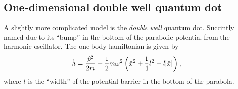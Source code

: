     \subsection{One-dimensional double well quantum dot}
        A slightly more complicated model is the \emph{double well} quantum dot.
        Succintly named due to its ``bump'' in the bottom of the parabolic
        potential from the harmonic oscillator. The one-body hamiltonian is
        given by
        \begin{align}
            \hat{h} = \frac{\hat{p}^2}{2m}
            + \frac{1}{2} m\omega^2\left( 
                \hat{x}^2
                + \frac{1}{4}l^2
                - l\abs{\hat{x}}
             \right),
        \end{align}
        where $l$ is the ``width'' of the potential barrier in the bottom of the
        parabola.

